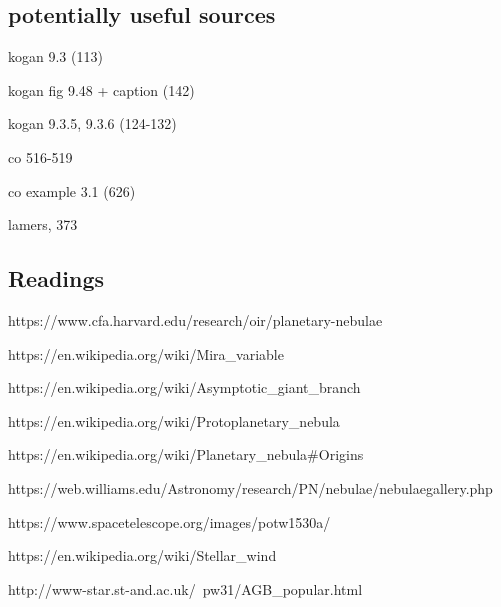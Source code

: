 \documentclass[a4paper,12pt]{article}
\begin{document}
\subsection{potentially useful sources}
kogan 9.3 (113)

kogan fig 9.48 + caption (142)

kogan 9.3.5, 9.3.6 (124-132)

co 516-519

co example 3.1 (626)

lamers, 373


\subsection{Readings}

https://www.cfa.harvard.edu/research/oir/planetary-nebulae

https://en.wikipedia.org/wiki/Mira_variable

https://en.wikipedia.org/wiki/Asymptotic_giant_branch

https://en.wikipedia.org/wiki/Protoplanetary_nebula

https://en.wikipedia.org/wiki/Planetary_nebula#Origins

https://web.williams.edu/Astronomy/research/PN/nebulae/nebulaegallery.php

https://www.spacetelescope.org/images/potw1530a/

https://en.wikipedia.org/wiki/Stellar_wind

http://www-star.st-and.ac.uk/~pw31/AGB_popular.html
\end{document}
